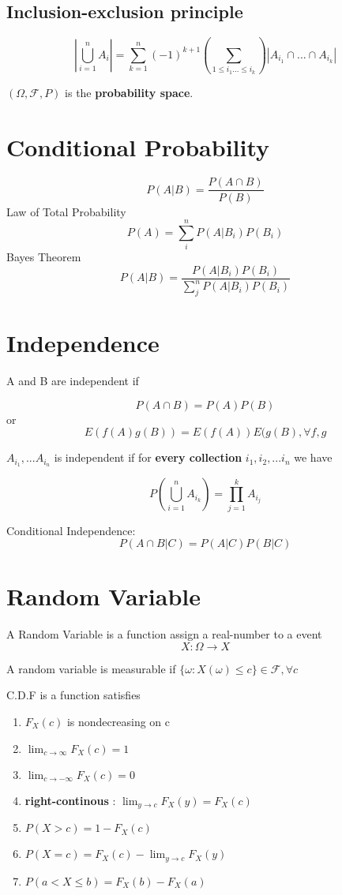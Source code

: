 \documentclass[11pt, openany]{book}              %
\begin{document}
\subsection*{Inclusion-exclusion principle}
$$\left| \bigcup_{i=1}^n A_i \right|= \sum_{k = 1}^n (-1)^{k+1} (\sum_{1\leq i_1 ... \leq i_k}) \left| A_{i_1}\cap...\cap A_{i_k}\right|$$

$(\Omega, \mathcal{F}, P)$ is the \textbf{probability space}.

\section{Conditional Probability}

$$P(A | B ) = \frac{P(A \cap B)}{P(B)} $$
Law of Total Probability
$$ P(A) = \sum_i^n P(A|B_i)P(B_i)$$
Bayes Theorem
$$P(A | B ) = \frac{P(A|B_i)P(B_i)}{\sum_j^n P(A|B_i)P(B_i)} $$

\section{Independence}

A and B are independent if

$$P(A \cap B) = P(A) P(B)$$ or
$$E(f(A) g(B)) = E(f(A)) E(g(B), \forall f,g$$

$A_{i_1}, ... A_{i_n}$ is independent if for \textbf{every collection} ${i_1, i_2,...i_n}$ we have

$$P(\bigcup_{i=1}^n A_{i_k}) = \prod_{j=1}^k A_{i_j}$$

Conditional Independence:
$$P(A \cap B |C) = P(A|C) P(B|C)$$
$$ $$

\section{Random Variable}

A Random Variable is a function assign a real-number to a event
$$X:\Omega \to X$$

A random variable is measurable if $\{\omega : X(\omega) \leq c\} \in \mathcal{F} , \forall c$

C.D.F is a function satisfies
\begin{enumerate}
	\item $F_X(c)$ is nondecreasing on c
	\item $\lim_{c \to \infty} F_X(c)=1$
	\item $\lim_{c \to -\infty} F_X(c)=0$
	\item \textbf{right-continous} : $\lim_{y \to c} F_X(y)=F_X(c)$
	\item $P(X >c) = 1-F_X(c)$
	\item $P(X = c) = F_X(c)-\lim_{y \to c} F_X(y)$
	\item $P(a < X \leq b) = F_X(b)-F_X(a)$
\end{enumerate}
\end{document}
